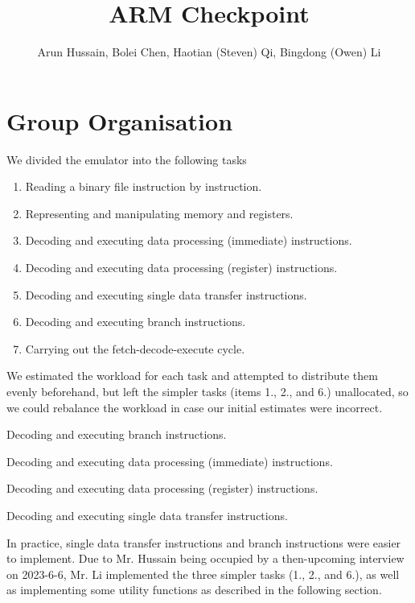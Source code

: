 \documentclass[11pt]{article}
\begin{document}
\title{ARM Checkpoint}
\author{Arun Hussain, Bolei Chen, Haotian (Steven) Qi, Bingdong (Owen) Li}

\maketitle

\section{Group Organisation}
We divided the emulator into the following tasks

\begin{enumerate}
    \item Reading a binary file instruction by instruction.
    \item Representing and manipulating memory and registers.
    \item Decoding and executing data processing (immediate) instructions.
    \item Decoding and executing data processing (register) instructions.
    \item Decoding and executing single data transfer instructions.
    \item Decoding and executing branch instructions.
    \item Carrying out the fetch-decode-execute cycle.
\end{enumerate}

We estimated the workload for each task and attempted to distribute them evenly
beforehand, but left the simpler tasks (items 1., 2., and 6.) unallocated, so we
could rebalance the workload in case our initial estimates were incorrect.

\begin{description} [align=right,labelwidth=3cm]
    \item [Arun Hussain] Decoding and executing branch instructions.
    \item [Bolei Chen] Decoding and executing data processing (immediate) instructions.
    \item [Haotian Qi] Decoding and executing data processing (register) instructions.
    \item [Bingdong Li] Decoding and executing single data transfer instructions.
\end{description}

In practice, single data transfer instructions and branch instructions were easier to
implement. Due to Mr. Hussain being occupied by a then-upcoming interview on 2023-6-6,
Mr. Li implemented the three simpler tasks (1., 2., and 6.), as well as implementing
some utility functions as described in the following section.
\end{document}
